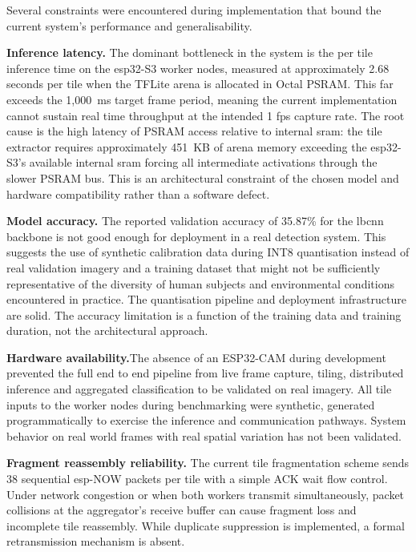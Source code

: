 Several constraints were encountered during implementation that bound the current
system's performance and generalisability.
 
\textbf{Inference latency.} The dominant bottleneck in the system is the per tile inference time on the \gls{esp}32-S3 worker nodes, measured at approximately 2.68 seconds per tile when the TFLite arena is allocated in Octal PSRAM. This far exceeds the 1,000~ms target frame period, meaning the current implementation cannot sustain real time throughput at the intended 1 \gls{fps} capture rate. The root cause is the high latency of PSRAM access relative to internal \gls{sram}: the tile extractor requires approximately 451~KB of arena memory exceeding the \gls{esp}32-S3’s available internal \gls{sram} forcing all intermediate activations through the slower PSRAM bus. This is an architectural constraint of the chosen model and hardware compatibility rather than a software defect.

 
\textbf{Model accuracy.} The reported validation accuracy of 35.87\% for the \gls{lbcnn} backbone is not good enough for deployment in a real detection system. This suggests the use of synthetic calibration data during INT8 quantisation instead of real validation imagery and a training dataset that might not be sufficiently representative of the diversity of human subjects and environmental conditions encountered in practice. The quantisation pipeline and deployment infrastructure are solid. The accuracy limitation is a function of the training data and training duration, not the architectural approach.
 
\textbf{Hardware availability.}The absence of an ESP32-CAM during development prevented the full end to end pipeline from live frame capture, tiling, distributed inference and aggregated classification to be validated on real imagery. All tile inputs to the worker nodes during benchmarking were synthetic, generated programmatically to exercise the inference and communication pathways. System behavior on real world frames with real spatial variation has not been validated.

\textbf{Fragment reassembly reliability.} The current tile fragmentation scheme sends 38
sequential \gls{esp}-NOW packets per tile with a simple ACK wait flow control. Under
network congestion or when both workers transmit simultaneously, packet collisions at the
aggregator's receive buffer can cause fragment loss and incomplete tile reassembly. While
duplicate suppression is implemented, a formal retransmission mechanism is absent.
 
